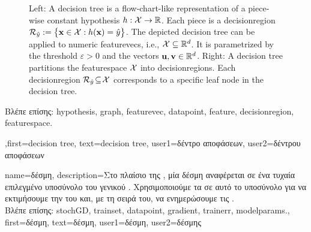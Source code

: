 {{\begin{figure}[H]
\begin{minipage}{.45\textwidth}
	\end{minipage}
	\caption{Left: A decision tree is a flow-chart-like representation of a piece-wise constant \gls{hypothesis} $h: \mathcal{X} \rightarrow \mathbb{R}$.  
		Each piece is a \gls{decisionregion} $\mathcal{R}_{\hat{y}} := \big\{ {\bf x} \in  \mathcal{X}: h({\bf x}) = \hat{y} \big\}$. 
		The depicted decision tree can be applied to numeric \gls{featurevec}s, i.e., $\mathcal{X} \subseteq \mathbb{R}^{d}$. It is 
		parametrized by the threshold $\varepsilon>0$ and the vectors ${\bf u}, {\bf v} \in \mathbb{R}^{d}$. 
		Right: A decision tree partitions  
		the \gls{featurespace} $\mathcal{X}$ into \gls{decisionregion}s. Each \gls{decisionregion}  
		$\mathcal{R}_{\hat{y}} \!\subseteq\!\mathcal{X}$ corresponds to a specific leaf node in the decision tree.}
	\label{fig_decision_tree}
	\end{figure} 
	\foreignlanguage{greek}{Βλέπε επίσης:} \gls{hypothesis}, \gls{graph}, \gls{featurevec}, \gls{datapoint}, \gls{feature}, \gls{decisionregion}, \gls{featurespace}.
	  }
	  ,first={decision tree},
	  text={decision tree},
	  user1={\foreignlanguage{greek}{δέντρο αποφάσεων}}, %
	  user2={\foreignlanguage{greek}{δέντρου αποφάσεων}} %
}

{name={\foreignlanguage{greek}{δέσμη}},
	description={\foreignlanguage{greek}{Στο πλαίσιο της} , 
		\foreignlanguage{greek}{μία δέσμη αναφέρεται σε ένα τυχαία επιλεγμένο υποσύνολο 
		του γενικού} . \foreignlanguage{greek}{Χρησιμοποιούμε τα}  
		\foreignlanguage{greek}{σε αυτό το υποσύνολο για να εκτιμήσουμε την} 
		 \foreignlanguage{greek}{του}  \foreignlanguage{greek}{και, με τη σειρά του, 
		να ενημερώσουμε τις} .\\
	\foreignlanguage{greek}{Βλέπε επίσης:} \gls{stochGD}, \gls{trainset}, \gls{datapoint}, \gls{gradient}, \gls{trainerr}, \gls{modelparams}.}, 
	first={\foreignlanguage{greek}{δέσμη}},
	text={\foreignlanguage{greek}{δέσμη}},
	user1={\foreignlanguage{greek}{δέσμη}}, %
    	user2={\foreignlanguage{greek}{δέσμης}} %
}

